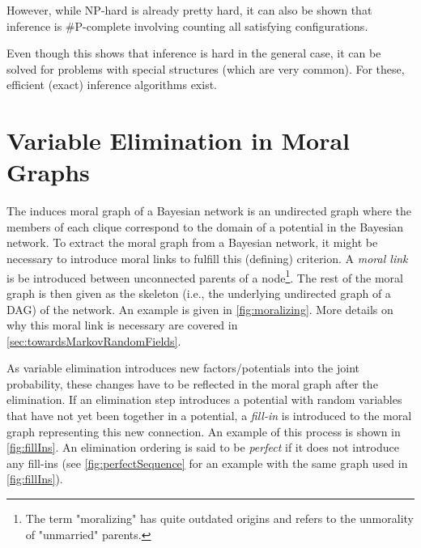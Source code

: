 		However, while NP-hard is already pretty hard, it can also be shown that inference is \#P-complete involving counting all satisfying configurations.

		Even though this shows that inference is hard in the general case, it can be solved for problems with special structures (which are very common). For these, efficient (exact) inference algorithms exist.

	\section{Variable Elimination in Moral Graphs}
		\label{sec:veMoral}

		The induces moral graph of a Bayesian network is an undirected graph where the members of each clique correspond to the domain of a potential in the Bayesian network. To extract the moral graph from a Bayesian network, it might be necessary to introduce moral links to fulfill this (defining) criterion. A \emph{moral link} is be introduced between unconnected parents of a node\footnote{The term "moralizing" has quite outdated origins and refers to the unmorality of "unmarried" parents.}. The rest of the moral graph is then given as the skeleton (i.e., the underlying undirected graph of a DAG) of the network. An example is given in \autoref{fig:moralizing}. More details on why this moral link is necessary are covered in \autoref{sec:towardsMarkovRandomFields}.

		As variable elimination introduces new factors/potentials into the joint probability, these changes have to be reflected in the moral graph after the elimination. If an elimination step introduces a potential with random variables that have not yet been together in a potential, a \emph{fill-in} is introduced to the moral graph representing this new connection. An example of this process is shown in \autoref{fig:fillIns}. An elimination ordering is said to be \emph{perfect} if it does not introduce any fill-ins (see \autoref{fig:perfectSequence} for an example with the same graph used in \autoref{fig:fillIns}).

